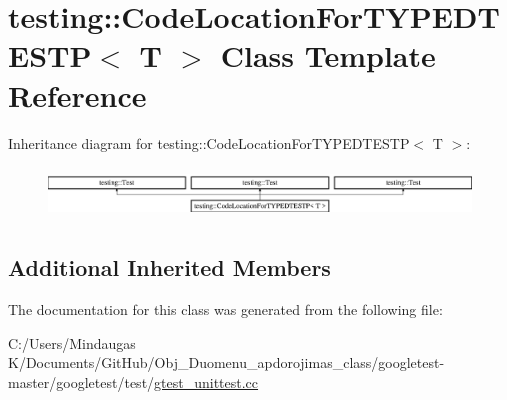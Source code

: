 \hypertarget{classtesting_1_1_code_location_for_t_y_p_e_d_t_e_s_t_p}{}\section{testing\+::Code\+Location\+For\+T\+Y\+P\+E\+D\+T\+E\+S\+TP$<$ T $>$ Class Template Reference}
\label{classtesting_1_1_code_location_for_t_y_p_e_d_t_e_s_t_p}
Inheritance diagram for testing\+::Code\+Location\+For\+T\+Y\+P\+E\+D\+T\+E\+S\+TP$<$ T $>$\+:\begin{figure}[H]
\begin{center}
\leavevmode
\includegraphics[height=1.382716cm]{d5/d1d/classtesting_1_1_code_location_for_t_y_p_e_d_t_e_s_t_p}
\end{center}
\end{figure}
\subsection*{Additional Inherited Members}


The documentation for this class was generated from the following file\+:\begin{DoxyCompactItemize}
\item 
C\+:/\+Users/\+Mindaugas K/\+Documents/\+Git\+Hub/\+Obj\+\_\+\+Duomenu\+\_\+apdorojimas\+\_\+class/googletest-\/master/googletest/test/\mbox{\hyperlink{googletest-master_2googletest_2test_2gtest__unittest_8cc}{gtest\+\_\+unittest.\+cc}}\end{DoxyCompactItemize}
